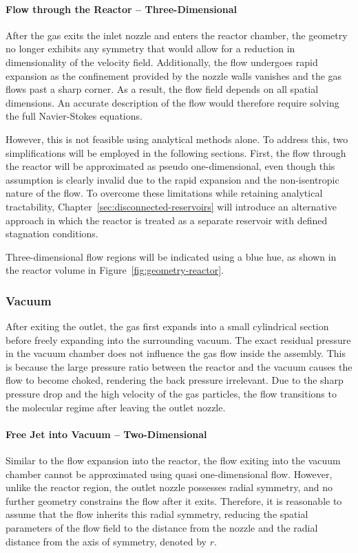 	\paragraph*{Flow through the Reactor -- Three-Dimensional}
		After the gas exits the inlet nozzle and enters the reactor chamber, the geometry no longer exhibits any symmetry that would allow for a reduction in dimensionality of the velocity field.
		Additionally, the flow undergoes rapid expansion as the confinement provided by the nozzle walls vanishes and the gas flows past a sharp corner.
		As a result, the flow field depends on all spatial dimensions.
		An accurate description of the flow would therefore require solving the full Navier-Stokes equations.

		However, this is not feasible using analytical methods alone.
		To address this, two simplifications will be employed in the following sections.
		First, the flow through the reactor will be approximated as pseudo one-dimensional, even though this assumption is clearly invalid due to the rapid expansion and the non-isentropic nature of the flow.
		To overcome these limitations while retaining analytical tractability, Chapter~\ref{sec:disconnected-reservoirs} will introduce an alternative approach in which the reactor is treated as a separate reservoir with defined stagnation conditions.

		Three-dimensional flow regions will be indicated using a blue hue, as shown in the reactor volume in Figure~\ref{fig:geometry-reactor}.

\subsubsection*{Vacuum}
	After exiting the outlet, the gas first expands into a small cylindrical section before freely expanding into the surrounding vacuum.
	The exact residual pressure in the vacuum chamber does not influence the gas flow inside the assembly.
	This is because the large pressure ratio between the reactor and the vacuum causes the flow to become choked, rendering the back pressure irrelevant.
	Due to the sharp pressure drop and the high velocity of the gas particles, the flow transitions to the molecular regime after leaving the outlet nozzle.

	\paragraph{Free Jet into Vacuum -- Two-Dimensional}
		Similar to the flow expansion into the reactor, the flow exiting into the vacuum chamber cannot be approximated using quasi one-dimensional flow.
		However, unlike the reactor region, the outlet nozzle possesses radial symmetry, and no further geometry constrains the flow after it exits.
		Therefore, it is reasonable to assume that the flow inherits this radial symmetry, reducing the spatial parameters of the flow field to the distance from the nozzle and the radial distance from the axis of symmetry, denoted by $r$.

